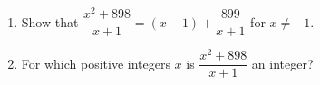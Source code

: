\begin{enumerate}
\item[(a)] Show that $\dfrac{x^2+898}{x+1}=(x-1)+\dfrac{899}{x+1}$ for $x\ne-1$.
\item[(b)] For which positive integers $x$ is $\dfrac{x^2+898}{x+1}$ an integer?
\end{enumerate}

